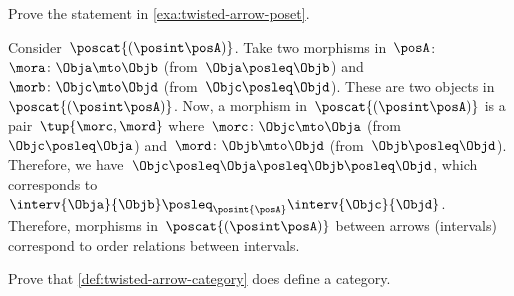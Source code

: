 \begin{exercise}
    Prove the statement in \cref{exa:twisted-arrow-poset}.
\end{exercise}
\begin{solution}
    Consider~$\poscat{\left(\posint\posA\right)}$.
    Take two morphisms in~$\posA$:~$\mora\colon \Obja \mto \Objb$ (from~$\Obja \posleq \Objb$) and~$\morb\colon \Objc\mto \Objd$ (from~$\Objc \posleq \Objd$).
    These are two objects in~$\poscat{\left(\posint\posA\right)}$.
    Now, a morphism in~$\poscat{\left(\posint\posA\right)}$ is a pair~$\tup{\morc,\mord}$ where~$\morc\colon \Objc \mto \Obja$ (from~$\Objc\posleq \Obja$) and~$\mord\colon \Objb \mto \Objd$ (from~$\Objb\posleq \Objd$).
    Therefore, we have~$\Objc\posleq \Obja\posleq \Objb\posleq \Objd$, which corresponds to~$\interv{\Obja}{\Objb}\posleq_{\posint{\posA}}\interv{\Objc}{\Objd}$.
    Therefore, morphisms in~$\poscat{\left(\posint\posA\right)}$ between arrows (intervals) correspond to order relations between intervals.
\end{solution}


\vfill

\begin{gradedexercise}
    \label{ex:TwistedCat}
    Prove that \cref{def:twisted-arrow-category} does define a category.
\end{gradedexercise}

